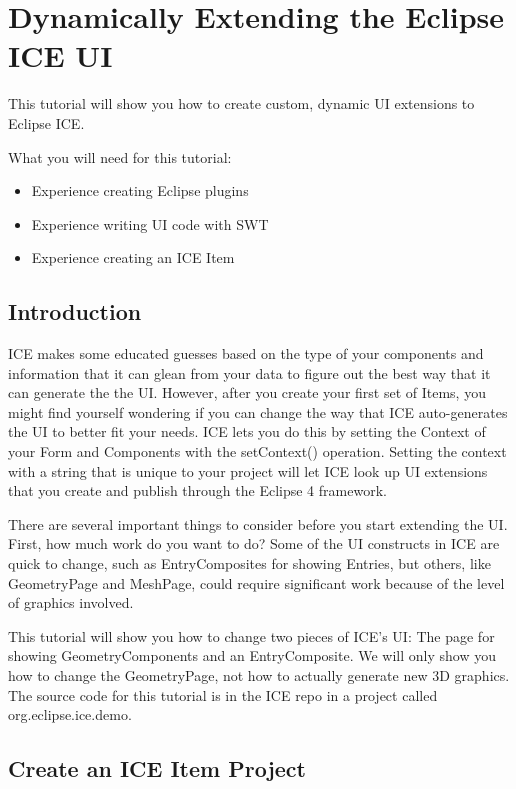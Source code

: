\chapter{Dynamically Extending the Eclipse ICE UI}

This tutorial will show you how to create custom, dynamic UI extensions to
Eclipse ICE.

What you will need for this tutorial:
\begin{itemize}
\item Experience creating Eclipse plugins
\item Experience writing UI code with SWT
\item Experience creating an ICE Item
\end{itemize}

\section{Introduction}

ICE makes some educated guesses based on the type of your components and
information that it can glean from your data to figure out the best way that it
can generate the the UI. However, after you create your first set of Items, you
might find yourself wondering if you can change the way that ICE auto-generates
the UI to better fit your needs. ICE lets you do this by setting the Context of
your Form and Components with the setContext() operation. Setting the context
with a string that is unique to your project will let ICE look up UI extensions
that you create and publish through the Eclipse 4 framework.

There are several important things to consider before you start extending the
UI. First, how much work do you want to do? Some of the UI constructs in ICE
are quick to change, such as EntryComposites for showing Entries, but others,
like GeometryPage and MeshPage, could require significant work because of the
level of graphics involved.

This tutorial will show you how to change two pieces of ICE’s UI: The page for
showing GeometryComponents and an EntryComposite. We will only show you how to
change the GeometryPage, not how to actually generate new 3D graphics. The
source code for this tutorial is in the ICE repo in a project called
org.eclipse.ice.demo.

\section{Create an ICE Item Project}


